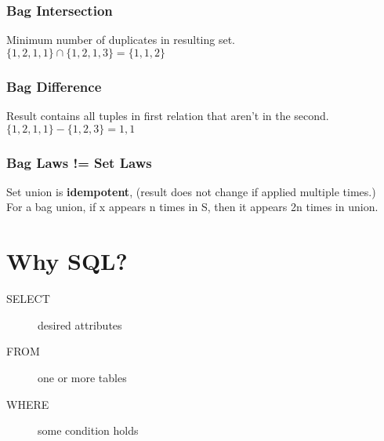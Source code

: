\documentclass[12pt]{article}
\begin{document}
\subsubsection{Bag Intersection}
Minimum number of duplicates in resulting set.\\
$\{1,2,1,1\} \cap \{1,2,1,3\} = \{1,1,2\}$
\subsubsection{Bag Difference}
Result contains all tuples in first relation that aren't in the second.\\
$\{1,2,1,1\} - \{1,2,3\} = {1,1}$
\subsubsection{Bag Laws != Set Laws}
Set union is \textbf{idempotent}, (result does not change if applied multiple
times.)\\
For a bag union, if x appears n times in S, then it appears 2n times in union.

\section{Why SQL?}
\begin{description}
    \item[SELECT]{desired attributes}
    \item[FROM]{one or more tables}
    \item[WHERE]{some condition holds}
\end{description}
\end{document}
